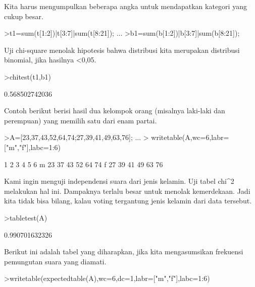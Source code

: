 \documentclass[a4paper,10pt]{article}
\begin{document}
\begin{eulernotebook}
\begin{eulercomment}
\begin{eulercomment}
\begin{eulercomment}
Kita harus mengumpulkan beberapa angka untuk mendapatkan kategori yang
cukup besar.
\end{eulercomment}
\begin{eulerprompt}
>t1=sum(t[1:2])|t[3:7]|sum(t[8:21]); ...
>b1=sum(b[1:2])|b[3:7]|sum(b[8:21]);
\end{eulerprompt}
\begin{eulercomment}
Uji chi-square menolak hipotesis bahwa distribusi kita merupakan
distribusi binomial, jika hasilnya \textless{}0,05.
\end{eulercomment}
\begin{eulerprompt}
>chitest(t1,b1)
\end{eulerprompt}
\begin{euleroutput}
  0.568502742036
\end{euleroutput}
\begin{eulercomment}
Contoh berikut berisi hasil dua kelompok orang (misalnya laki-laki dan
perempuan) yang memilih satu dari enam partai.
\end{eulercomment}
\begin{eulerprompt}
>A=[23,37,43,52,64,74;27,39,41,49,63,76];  ...
>  writetable(A,wc=6,labr=["m","f"],labc=1:6)
\end{eulerprompt}
\begin{euleroutput}
             1     2     3     4     5     6
       m    23    37    43    52    64    74
       f    27    39    41    49    63    76
\end{euleroutput}
\begin{eulercomment}
Kami ingin menguji independensi suara dari jenis kelamin. Uji tabel
chi\textasciicircum{}2 melakukan hal ini. Dampaknya terlalu besar untuk menolak
kemerdekaan. Jadi kita tidak bisa bilang, kalau voting tergantung
jenis kelamin dari data tersebut.
\end{eulercomment}
\begin{eulerprompt}
>tabletest(A)
\end{eulerprompt}
\begin{euleroutput}
  0.990701632326
\end{euleroutput}
\begin{eulercomment}
Berikut ini adalah tabel yang diharapkan, jika kita mengasumsikan
frekuensi pemungutan suara yang diamati.
\end{eulercomment}
\begin{eulerprompt}
>writetable(expectedtable(A),wc=6,dc=1,labr=["m","f"],labc=1:6)
\end{eulerprompt}
\begin{euleroutput}

\end{euleroutput}
\end{eulercomment}
\end{eulercomment}
\end{eulernotebook}
\end{document}
